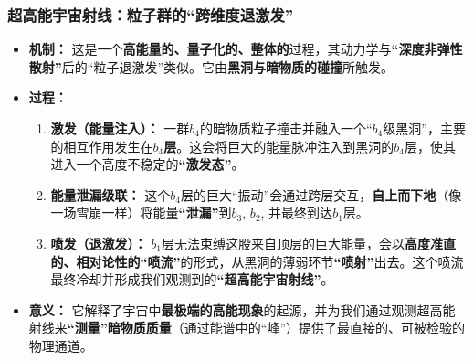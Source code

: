 \documentclass[11pt, a4paper]{article}
\begin{document}
\subsubsection{超高能宇宙射线：粒子群的“跨维度退激发”}
\begin{itemize}
    \item \textbf{机制：} 这是一个\textbf{高能量的、量子化的、整体的}过程，其动力学与\textbf{“深度非弹性散射”}后的“粒子退激发”类似。它由\textbf{黑洞与暗物质的碰撞}所触发。
    \item \textbf{过程：}
    \begin{enumerate}
        \item \textbf{激发（能量注入）：} 一群$b_4$的暗物质粒子撞击并融入一个“$b_4$级黑洞”，主要的相互作用发生在\textbf{$b_4$层}。这会将巨大的能量脉冲注入到黑洞的$b_4$层，使其进入一个高度不稳定的\textbf{“激发态”}。
        \item \textbf{能量泄漏级联：} 这个$b_4$层的巨大“振动”会通过跨层交互，\textbf{自上而下地}（像一场雪崩一样）将能量\textbf{“泄漏”}到$b_3$, $b_2$, 并最终到达$b_1$层。
        \item \textbf{喷发（退激发）：} $b_1$层无法束缚这股来自顶层的巨大能量，会以\textbf{高度准直的、相对论性的“喷流”}的形式，从黑洞的薄弱环节\textbf{“喷射”}出去。这个喷流最终冷却并形成我们观测到的\textbf{“超高能宇宙射线”}。
    \end{enumerate}
    \item \textbf{意义：} 它解释了宇宙中\textbf{最极端的高能现象}的起源，并为我们通过观测超高能射线来\textbf{“测量”暗物质质量}（通过能谱中的“峰”）提供了最直接的、可被检验的物理通道。
\end{itemize}
\end{document}
